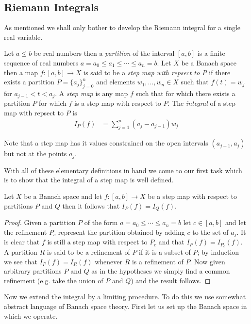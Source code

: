 \subsection{Riemann Integrals}
As mentioned we shall only bother to develop the Riemann integral for
a single real variable.
\begin{defn}Let $a \leq b$ be real numbers then a \emph{partition} of
  the interval $[a,b]$ is a finite sequence of real numbers $a=a_0
  \leq a_1 \leq \dotsb \leq a_n = b$.  Let $X$ be a Banach space then
  a map $f : [a,b] \to X$ is said to be a \emph{step map with repsect
    to P} if there
  exists a partition $P=\lbrace a_j \rbrace_{j=0}^n$ and elements $w_1,
  \dotsc, w_n \in X$ such that $f(t) = w_j$ for $a_{j-1} < t < a_j$.
  A \emph{step map} is any map $f$ such that for which there exists a partition
  $P$ for which $f$ is a step map with respect to $P$.
  The \emph{integral} of a step map with repsect to $P$ is
\begin{align*}
I_P(f) &= 
\sum_{j=1}^n (a_j - a_{j-1}) w_j
\end{align*}
\end{defn}
Note that a step map has it values constrained on the open intervals
$(a_{j-1},a_j)$ but not at the points $a_j$.

With all of these elementary definitions in hand we come to our first
task which is to show that the integral of a step map is well defined.
\begin{prop}Let $X$ be a Banach space and let $f : [a,b] \to X$ be a
  step map with respect to partitions $P$ and $Q$ then it follows that
  $I_P(f) = I_Q(f)$.
\end{prop}
\begin{proof}
Given a partition $P$ of the form $a=a_0 \leq \dotsb \leq a_n=b$ let
$c \in [a,b]$ and let the refinement $P_c$ represent the partition
obtained by adding $c$ to the set of $a_j$.  It is clear that $f$ is
still a step map with respect to $P_c$ and that $I_P(f)
= I_{P_c}(f)$.  A partition $R$ is said to be a refinement of $P$ if
it is a subset of $P$; by induction we see that $I_P(f) = I_R(f)$
whenever $R$ is a refinement of $P$.  Now given arbitrary partitions
$P$ and $Q$ as in the hypotheses we simply find a common refinement
(e.g. take the union of $P$ and $Q$) and the result follows.
\end{proof}

Now we extend the integral by a limiting procedure.  To do this we use 
somewhat abstract language of Banach space theory.  First let us set
up the Banach space in which we operate.

